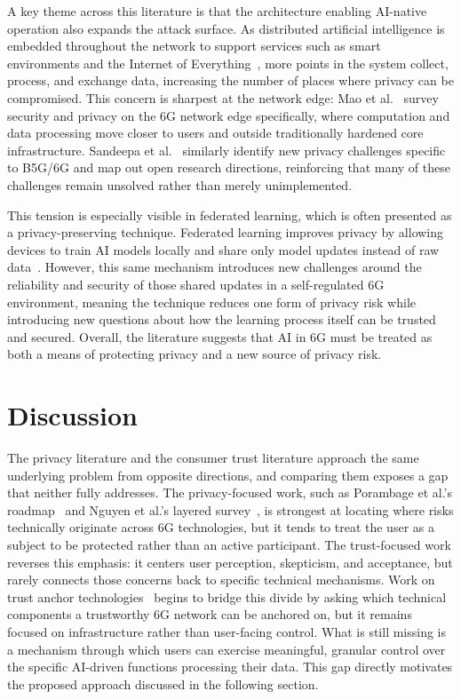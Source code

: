 \documentclass[letterpaper]{article}
\begin{document}
A key theme across this literature is that the architecture enabling AI-native
operation also expands the attack surface. As distributed artificial intelligence is
embedded throughout the network to support services such as smart environments and
the Internet of Everything~\cite{janbi2020}, more points in the system collect,
process, and exchange data, increasing the number of places where privacy can be
compromised. This concern is sharpest at the network edge: Mao et
al.~\cite{mao2023} survey security and privacy on the 6G network edge specifically,
where computation and data processing move closer to users and outside traditionally
hardened core infrastructure. Sandeepa et al.~\cite{sandeepa2022} similarly identify
new privacy challenges specific to B5G/6G and map out open research directions,
reinforcing that many of these challenges remain unsolved rather than merely
unimplemented.

This tension is especially visible in federated learning, which is often presented
as a privacy-preserving technique. Federated learning improves privacy by allowing
devices to train AI models locally and share only model updates instead of raw
data~\cite{taghia2024}. However, this same mechanism introduces new challenges
around the reliability and security of those shared updates in a self-regulated 6G
environment, meaning the technique reduces one form of privacy risk while
introducing new questions about how the learning process itself can be trusted and
secured. Overall, the literature suggests that AI in 6G must be treated as both a
means of protecting privacy and a new source of privacy risk.

\section{Discussion}
The privacy literature and the consumer trust literature approach the same underlying
problem from opposite directions, and comparing them exposes a gap that neither fully
addresses. The privacy-focused work, such as Porambage et al.'s
roadmap~\cite{porambage2021} and Nguyen et al.'s layered survey~\cite{nguyen2021}, is
strongest at locating where risks technically originate across 6G technologies, but it
tends to treat the user as a subject to be protected rather than an active participant.
The trust-focused work reverses this emphasis: it centers user perception, skepticism,
and acceptance, but rarely connects those concerns back to specific technical
mechanisms. Work on trust anchor technologies~\cite{veith2023} begins to bridge this
divide by asking which technical components a trustworthy 6G network can be anchored
on, but it remains focused on infrastructure rather than user-facing control. What is
still missing is a mechanism through which users can exercise meaningful, granular
control over the specific AI-driven functions processing their data. This gap directly
motivates the proposed approach discussed in the following section.
\end{document}
